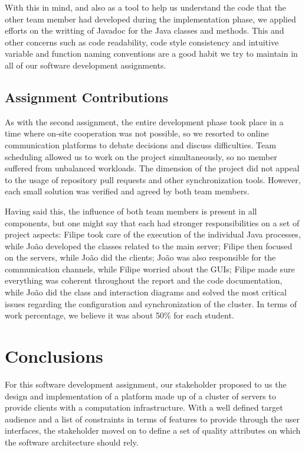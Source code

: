\documentclass[12pt]{article}
\begin{document}
With this in mind, and also as a tool to help us understand the code that the other team member had developed during the implementation phase, we applied efforts
on the writting of Javadoc for the Java classes and methods.
This and other concerns such as code readability, code style consistency and intuitive variable and function naming conventions are a good habit we try to maintain
in all of our software development assignments.

\subsection{Assignment Contributions} \label{contributions} %

As with the second assignment, the entire development phase took place in a time where on-site cooperation was not possible, so we resorted to online 
communication platforms to debate decisions and discuss difficulties.
Team scheduling allowed us to work on the project simultaneously, so no member suffered from unbalanced workloads.
The dimension of the project did not appeal to the usage of repository pull requests and other synchronization tools.
However, each small solution was verified and agreed by both team members.

Having said this, the influence of both team members is present in all components, but one might say that each had stronger responsibilities on a set of project aspects:
Filipe took care of the execution of the individual Java processes, while João developed the classes related to the main server; 
Filipe then focused on the servers, while João did the clients;
João was also responsible for the communication channels, while Filipe worried about the GUIs;
Filipe made sure everything was coherent throughout the report and the code
documentation, while João did the class and interaction diagrams and solved the most critical issues regarding the configuration and synchronization of the cluster.
In terms of work percentage, we believe it was about 50\% for each student. 

\newpage
\section*{Conclusions} \label{conclusions} %

For this software development assignment, our stakeholder proposed to us the design and implementation of a platform made up of a cluster of servers to provide 
clients with a computation infrastructure.
With a well defined target audience and a list of constraints in terms of features to provide through the user interfaces, the stakeholder moved on to define 
a set of quality attributes on which the software architecture should rely.
\end{document}
